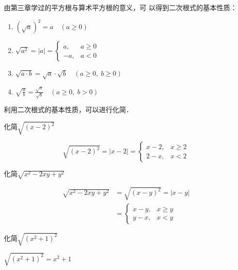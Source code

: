 由第三章学过的平方根与算术平方根的意义，可
以得到二次根式的基本性质：
\begin{blk}{}
    \begin{enumerate}
        \item $\left(\sqrt{a}\right)^2=a\quad (a\ge 0)$
        \item $\sqrt{a^2}=|a|=\begin{cases}
            a, & a\ge 0\\ -a, & a<0
        \end{cases}$
        \item $\sqrt{a\cdot b}=\sqrt{a}\cdot \sqrt{b}\quad (a\ge 0,\; b\ge 0)$
        \item $\sqrt{\frac{a}{b}}=\frac{\sqrt{a}}{\sqrt{b}}\quad (a\ge 0,\; b>0)$
    \end{enumerate}
\end{blk}

利用二次根式的基本性质，可以进行化简．


\begin{example}
    化简$\sqrt{(x-2)^2}$
\end{example}

\begin{solution}
    \[\sqrt{(x-2)^2}=|x-2|=\begin{cases}
        x-2, & x\ge2\\ 2-x, & x<2
    \end{cases}\]
\end{solution}



\begin{example}
化简$\sqrt{x^2-2xy+y^2}$    
\end{example}

\begin{solution}
    \[\begin{split}
\sqrt{x^2-2xy+y^2}&=\sqrt{(x-y)^2}=|x-y|\\
&=\begin{cases}
    x-y, & x\ge y\\
    y-x, & x<y
\end{cases}
    \end{split}\]
\end{solution}

\begin{example}
    化简$\sqrt{(x^2+1)^2}$
\end{example}

\begin{solution}
    $\sqrt{(x^2+1)^2}=x^2+1$
\end{solution}

